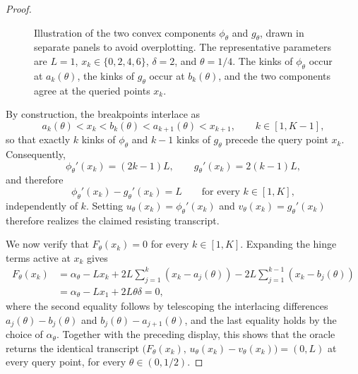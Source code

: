 \begin{proof}
\begin{figure}[t]
\begin{tikzpicture}
\end{tikzpicture}
\vspace{0.35em}
\caption{
Illustration of the two convex components \(\phi_\theta\) and \(g_\theta\),
drawn in separate panels to avoid overplotting.
The representative parameters are \(L=1\), \(x_k\in\{0,2,4,6\}\),
\(\delta=2\), and \(\theta=1/4\). The kinks of \(\phi_\theta\) occur at
\(a_k(\theta)\), the kinks of \(g_\theta\) occur at \(b_k(\theta)\), and the
two components agree at the queried points \(x_k\).
}
\label{fig:dc-components}
\end{figure}


By construction, the breakpoints interlace as
\[
    a_k(\theta)<x_k<b_k(\theta)<a_{k+1}(\theta)<x_{k+1},
    \qquad k\in[1,K-1],
\]
so that exactly $k$ kinks of $\phi_\theta$ and $k-1$ kinks of $g_\theta$
precede the query point $x_k$. Consequently,
\[
    \phi_\theta'(x_k)=(2k-1)L,
    \qquad
    g_\theta'(x_k)=2(k-1)L,
\]
and therefore
\[
    \phi_\theta'(x_k)-g_\theta'(x_k)=L
    \qquad\text{for every } k\in[1,K],
\]
independently of $k$. Setting $u_\theta(x_k)=\phi_\theta'(x_k)$ and
$v_\theta(x_k)=g_\theta'(x_k)$ therefore realizes the claimed resisting
transcript.

We now verify that $F_\theta(x_k)=0$ for every $k\in[1,K]$. Expanding the
hinge terms active at $x_k$ gives
\[
\begin{aligned}
F_\theta(x_k)
&=
\alpha_\theta-Lx_k
+2L\sum_{j=1}^{k}(x_k-a_j(\theta))
-2L\sum_{j=1}^{k-1}(x_k-b_j(\theta)) \\
&=
\alpha_\theta-Lx_1+2L\theta\delta
=
0,
\end{aligned}
\]
where the second equality follows by telescoping the interlacing
differences $a_j(\theta)-b_j(\theta)$ and $b_j(\theta)-a_{j+1}(\theta)$, and
the last equality holds by the choice of $\alpha_\theta$. Together with the
preceding display, this shows that the oracle returns the identical
transcript $\bigl(F_\theta(x_k),\,u_\theta(x_k)-v_\theta(x_k)\bigr)=(0,L)$ at
every query point, for every $\theta\in(0,1/2)$.


\end{proof}
